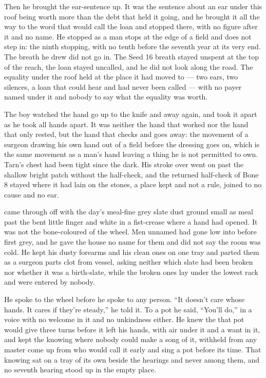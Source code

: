 Then he brought the ear-sentence up. It was the sentence about an ear under this roof being worth more than the debt that held it going, and he brought it all the way to the word that would call the loan and stopped there, with no figure after it and no name. He stopped as a man stops at the edge of a field and does not step in: the ninth stopping, with no tenth before the seventh year at its very end. The breath he drew did not go in. The Seed 16 breath stayed unspent at the top of the reach, the loan stayed uncalled, and he did not look along the road. The equality under the roof held at the place it had moved to --- two ears, two silences, a loan that could hear and had never been called --- with no payer named under it and nobody to say what the equality was worth.

The boy watched the hand go up to the knife and away again, and took it apart as he took all hands apart. It was neither the hand that worked nor the hand that only rested, but the hand that checks and goes away: the movement of a surgeon drawing his own hand out of a field before the dressing goes on, which is the same movement as a man's hand leaving a thing he is not permitted to own. Tarn's chest had been tight since the dark. His stroke over  went on past the shallow bright patch without the half-check, and the returned half-check of Bone 8 stayed where it had lain on the stones, a place kept and not a rule, joined to no cause and no ear.

\scenebreak

 came through  off  with the day's meal-fine grey slate dust ground small as meal past the bent little finger and white in a fist-crease where a hand had opened. It was not the bone-coloured  of the wheel. Men unnamed had gone low into  before first grey, and he gave the house no name for them and did not say the room was cold. He kept his dusty forearms and his clean ones on one tray and parted them as a surgeon parts clot from vessel, asking neither which slate had been broken nor whether it was a birth-slate, while the broken ones lay under the lowest rack and were entered by nobody.

He spoke to the wheel before he spoke to any person. “It doesn't care whose hands. It cares if they're steady,” he told it. To a pot he said, “You'll do,” in a voice with no welcome in it and no unkindness either. He knew the  that pot would give three turns before it left his hands, with air under it and a want in it, and kept the knowing where nobody could make a song of it, withheld from any master come up from  who would call it early and sing a pot before its time. That knowing sat on a tray of its own beside the hearings and never among them, and no seventh hearing stood up in the empty place.


